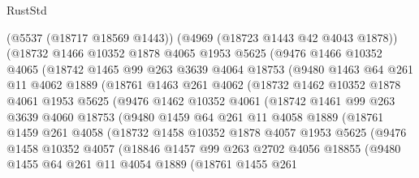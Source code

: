 \begin{lexlean}{RustStd}
\begin{coremodule}
        (@5537 (@18717 @18569 @1443))
        (@4969 (@18723 @1443 @42 @4043 @1878))
        (@18732
          @1466
          @10352
          @1878
          @4065
          @1953
          @5625
          (@9476
            @1466
            @10352
            @4065
            (@18742
              @1465
              @99
              @263
              @3639
              @4064
              @18753
              (@9480
                @1463
                @64
                @261
                @11
                @4062
                @1889
                (@18761
                  @1463
                  @261
                  @4062
                  (@18732
                    @1462
                    @10352
                    @1878
                    @4061
                    @1953
                    @5625
                    (@9476
                      @1462
                      @10352
                      @4061
                      (@18742
                        @1461
                        @99
                        @263
                        @3639
                        @4060
                        @18753
                        (@9480
                          @1459
                          @64
                          @261
                          @11
                          @4058
                          @1889
                          (@18761
                            @1459
                            @261
                            @4058
                            (@18732
                              @1458
                              @10352
                              @1878
                              @4057
                              @1953
                              @5625
                              (@9476
                                @1458
                                @10352
                                @4057
                                (@18846
                                  @1457
                                  @99
                                  @263
                                  @2702
                                  @4056
                                  @18855
                                  (@9480
                                    @1455
                                    @64
                                    @261
                                    @11
                                    @4054
                                    @1889
                                    (@18761
                                      @1455
                                      @261

\end{coremodule}
\end{lexlean}
